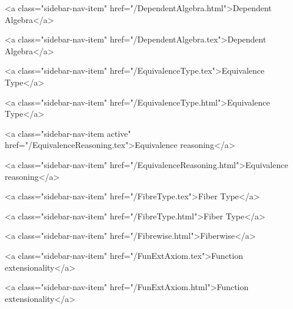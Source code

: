       
    
      
        
          <a class="sidebar-nav-item" href="/DependentAlgebra.html">Dependent Algebra</a>
        
      
    
      
        
          <a class="sidebar-nav-item" href="/DependentAlgebra.tex">Dependent Algebra</a>
        
      
    
      
        
          <a class="sidebar-nav-item" href="/EquivalenceType.tex">Equivalence Type</a>
        
      
    
      
        
          <a class="sidebar-nav-item" href="/EquivalenceType.html">Equivalence Type</a>
        
      
    
      
        
          <a class="sidebar-nav-item active" href="/EquivalenceReasoning.tex">Equivalence reasoning</a>
        
      
    
      
        
          <a class="sidebar-nav-item" href="/EquivalenceReasoning.html">Equivalence reasoning</a>
        
      
    
      
        
          <a class="sidebar-nav-item" href="/FibreType.tex">Fiber Type</a>
        
      
    
      
        
          <a class="sidebar-nav-item" href="/FibreType.html">Fiber Type</a>
        
      
    
      
        
          <a class="sidebar-nav-item" href="/Fibrewise.html">Fiberwise</a>
        
      
    
      
        
          <a class="sidebar-nav-item" href="/FunExtAxiom.tex">Function extensionality</a>
        
      
    
      
        
          <a class="sidebar-nav-item" href="/FunExtAxiom.html">Function extensionality</a>
        
